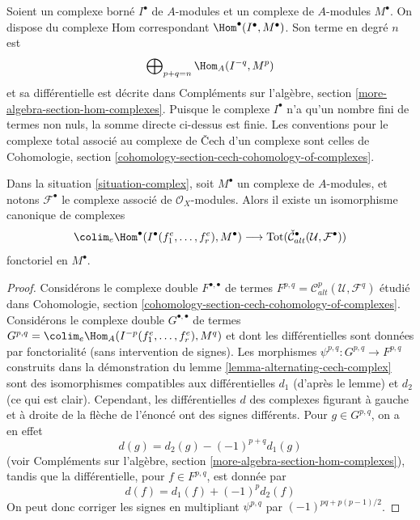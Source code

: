 \noindent
Soient un complexe borné $I^\bullet$ de $A$-modules et un
complexe de $A$-modules $M^\bullet$. On dispose du
complexe Hom correspondant $\Hom^\bullet(I^\bullet, M^\bullet)$. Son terme
en degré $n$ est
$$
\bigoplus\nolimits_{p + q = n} \Hom_A(I^{-q}, M^p)
$$
et sa différentielle est décrite dans Compléments sur l'algèbre, section
\ref{more-algebra-section-hom-complexes}.
Puisque le complexe $I^\bullet$ n'a qu'un nombre fini de termes non nuls, la
somme directe ci-dessus est finie.
Les conventions pour le complexe total associé au
complexe de {\v C}ech d'un complexe sont celles de
Cohomologie, section \ref{cohomology-section-cech-cohomology-of-complexes}.

\begin{lemma}
\label{lemma-alternating-cech-complex-complex}
Dans la situation \ref{situation-complex}, soit $M^\bullet$ un
complexe de $A$-modules, et
notons $\mathcal{F}^\bullet$ le complexe associé de
$\mathcal{O}_X$-modules. Alors
il existe un isomorphisme canonique de complexes
$$
\colim_e \Hom^\bullet(I^\bullet(f_1^e, \ldots, f_r^e), M^\bullet)
\longrightarrow
\text{Tot}(\check{\mathcal{C}}_{alt}^\bullet(\mathcal{U}, \mathcal{F}^\bullet))
$$
fonctoriel en $M^\bullet$.
\end{lemma}

\begin{proof}
Considérons le complexe double $F^{\bullet, \bullet}$ de termes
$F^{p, q} = \mathcal{C}_{alt}^p(\mathcal{U}, \mathcal{F}^q)$
étudié dans
Cohomologie, section \ref{cohomology-section-cech-cohomology-of-complexes}.
Considérons le complexe double $G^{\bullet, \bullet}$ de termes
$G^{p, q} = \colim_e \Hom_A(I^{-p}(f_1^e, \ldots, f_r^e), M^q)$ et
dont les différentielles sont données par fonctorialité (sans intervention
de signes). Les morphismes $\psi^{p, q} : G^{p, q} \to F^{p, q}$
construits dans la démonstration du lemme \ref{lemma-alternating-cech-complex}
sont des isomorphismes compatibles aux différentielles $d_1$ (d'après le lemme)
et $d_2$ (ce qui est clair). Cependant, les différentielles $d$ des
complexes figurant à gauche et à droite de la flèche de l'énoncé
ont des signes différents. Pour $g \in G^{p, q}$, on a en effet
$$
d(g) =  d_2(g) - (-1)^{p + q} d_1(g) 
$$
(voir Compléments sur l'algèbre, section \ref{more-algebra-section-hom-complexes}),
tandis que la différentielle, pour $f \in F^{p, q}$, est donnée par
$$
d(f) = d_1(f) + (-1)^p d_2(f)
$$
On peut donc corriger les signes en multipliant $\psi^{p, q}$ par
$(-1)^{pq + p(p - 1)/2}$.
\end{proof}

